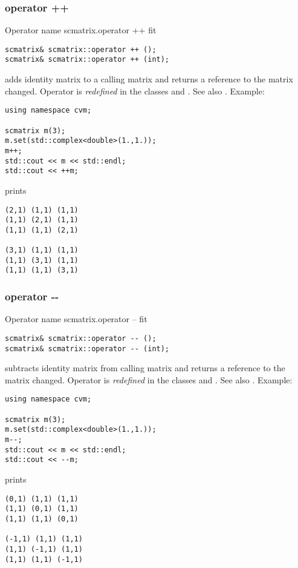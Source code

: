 \subsubsection{operator ++}
Operator%
\pdfdest name {scmatrix.operator ++} fit
\begin{verbatim}
scmatrix& scmatrix::operator ++ ();
scmatrix& scmatrix::operator ++ (int);
\end{verbatim}
adds identity matrix to a calling matrix
and returns a reference to
the matrix changed.
Operator is \emph{redefined} in the classes
 and .
See also .
Example:
\begin{Verbatim}
using namespace cvm;

scmatrix m(3);
m.set(std::complex<double>(1.,1.));
m++;
std::cout << m << std::endl;
std::cout << ++m;
\end{Verbatim}
prints
\begin{Verbatim}
(2,1) (1,1) (1,1)
(1,1) (2,1) (1,1)
(1,1) (1,1) (2,1)

(3,1) (1,1) (1,1)
(1,1) (3,1) (1,1)
(1,1) (1,1) (3,1)
\end{Verbatim}
\newpage



\subsubsection{operator -{}-}
Operator%
\pdfdest name {scmatrix.operator --} fit
\begin{verbatim}
scmatrix& scmatrix::operator -- ();
scmatrix& scmatrix::operator -- (int);
\end{verbatim}
subtracts identity matrix from  calling matrix
and returns a reference to
the matrix changed.
Operator is \emph{redefined} in the classes
 and .
See also .
Example:
\begin{Verbatim}
using namespace cvm;

scmatrix m(3);
m.set(std::complex<double>(1.,1.));
m--;
std::cout << m << std::endl;
std::cout << --m;
\end{Verbatim}
prints
\begin{Verbatim}
(0,1) (1,1) (1,1)
(1,1) (0,1) (1,1)
(1,1) (1,1) (0,1)

(-1,1) (1,1) (1,1)
(1,1) (-1,1) (1,1)
(1,1) (1,1) (-1,1)
\end{Verbatim}
\newpage




